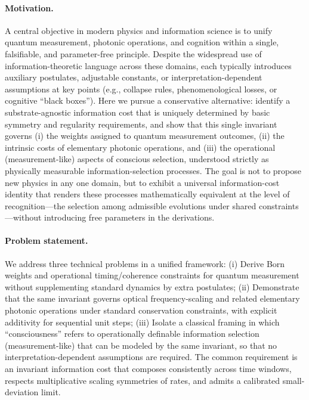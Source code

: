 \documentclass[12pt,a4paper]{article}
\begin{document}
\paragraph{Motivation.}
A central objective in modern physics and information science is to unify quantum measurement, photonic operations, and cognition within a single, falsifiable, and parameter-free principle. Despite the widespread use of information-theoretic language across these domains, each typically introduces auxiliary postulates, adjustable constants, or interpretation-dependent assumptions at key points (e.g., collapse rules, phenomenological losses, or cognitive “black boxes”). Here we pursue a conservative alternative: identify a substrate-agnostic information cost that is uniquely determined by basic symmetry and regularity requirements, and show that this single invariant governs (i) the weights assigned to quantum measurement outcomes, (ii) the intrinsic costs of elementary photonic operations, and (iii) the operational (measurement-like) aspects of conscious selection, understood strictly as physically measurable information-selection processes. The goal is not to propose new physics in any one domain, but to exhibit a universal information-cost identity that renders these processes mathematically equivalent at the level of recognition—the selection among admissible evolutions under shared constraints—without introducing free parameters in the derivations.

\paragraph{Problem statement.}
We address three technical problems in a unified framework:
(i) Derive Born weights and operational timing/coherence constraints for quantum measurement without supplementing standard dynamics by extra postulates;
(ii) Demonstrate that the same invariant governs optical frequency-scaling and related elementary photonic operations under standard conservation constraints, with explicit additivity for sequential unit steps;
(iii) Isolate a classical framing in which “consciousness” refers to operationally definable information selection (measurement-like) that can be modeled by the same invariant, so that no interpretation-dependent assumptions are required. The common requirement is an invariant information cost that composes consistently across time windows, respects multiplicative scaling symmetries of rates, and admits a calibrated small-deviation limit.
\end{document}
